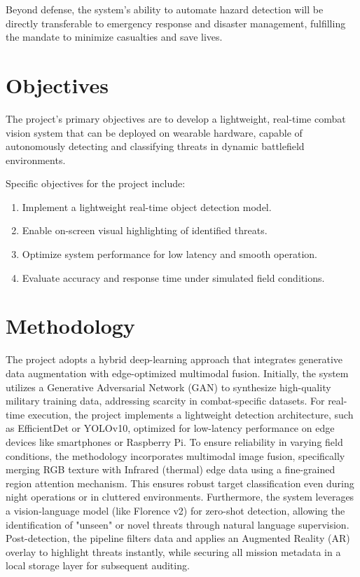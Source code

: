 Beyond defense, the system's ability to automate hazard detection will be directly transferable to
emergency response and disaster management, fulfilling the mandate to minimize casualties and save
lives.

\label{end:motivation}
\section{Objectives}\label{sec:objectives}
The project's primary objectives are to develop a lightweight, real-time combat vision system that
can be deployed on wearable hardware, capable of autonomously detecting and classifying threats in
dynamic battlefield environments. \vspace{6pt}

Specific objectives for the project include:
\begin{enumerate}[label=\roman*.]
  \item Implement a lightweight real-time object detection model.
  \item Enable on-screen visual highlighting of identified threats.
  \item Optimize system performance for low latency and smooth operation.
  \item Evaluate accuracy and response time under simulated field conditions.
  \label{end:objectives}
\end{enumerate}
\section{Methodology}\label{sec:methodology}
The project adopts a hybrid deep-learning approach that integrates generative data augmentation with
edge-optimized multimodal fusion. Initially, the system utilizes a Generative Adversarial Network
(GAN) to synthesize high-quality military training data, addressing scarcity in combat-specific
datasets. For real-time execution, the project implements a lightweight detection architecture, such
as EfficientDet or YOLOv10, optimized for low-latency performance on edge devices like smartphones
or Raspberry Pi. To ensure reliability in varying field conditions, the methodology incorporates
multimodal image fusion, specifically merging RGB texture with Infrared (thermal) edge data using a
fine-grained region attention mechanism. This ensures robust target classification even during night
operations or in cluttered environments. Furthermore, the system leverages a vision-language model
(like Florence v2) for zero-shot detection, allowing the identification of "unseen" or novel threats
through natural language supervision. Post-detection, the pipeline filters data and applies an
Augmented Reality (AR) overlay to highlight threats instantly, while securing all mission metadata
in a local storage layer for subsequent auditing.


